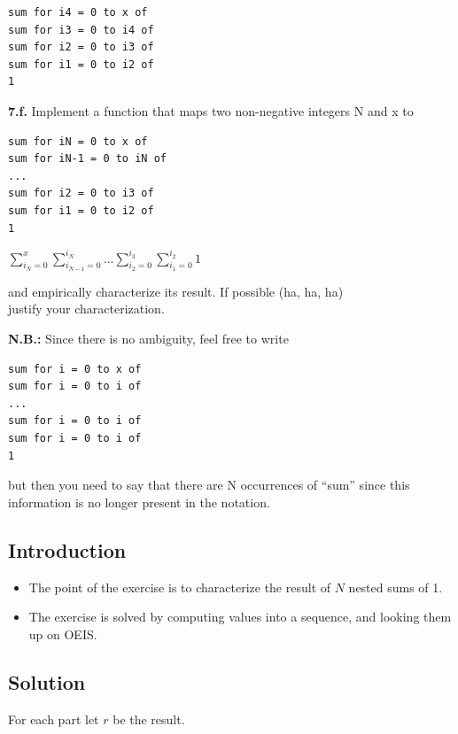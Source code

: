 \documentclass[12pt]{article}
\begin{document}
\begin{verbatim}
sum for i4 = 0 to x of
sum for i3 = 0 to i4 of
sum for i2 = 0 to i3 of
sum for i1 = 0 to i2 of
1
\end{verbatim}

\textbf{7.f.} Implement a function that maps two non-negative integers N and x to

\begin{verbatim}
sum for iN = 0 to x of
sum for iN-1 = 0 to iN of
...
sum for i2 = 0 to i3 of
sum for i1 = 0 to i2 of
1
\end{verbatim}

$\displaystyle\sum_{i_{N}=0}^{x}\sum_{i_{N-1}=0}^{i_{N}}\dots\sum_{i_{2}=0}^{i_{3}}\sum_{i_{1}=0}^{i_{2}}1$

and empirically characterize its result. If possible (ha, ha, ha) \\ justify your
characterization.

\textbf{N.B.:} Since there is no ambiguity, feel free to write

\begin{verbatim}
sum for i = 0 to x of
sum for i = 0 to i of
...
sum for i = 0 to i of
sum for i = 0 to i of
1
\end{verbatim}

but then you need to say that there are N occurrences of ``sum'' since this
information is no longer present in the notation.


\subsection{Introduction}

\begin{itemize}

\item
  The point of the exercise is to characterize the result of $N$ nested sums of 1.

\item
  The exercise is solved by computing values into a sequence, and looking them up on OEIS.

\end{itemize}


\subsection{Solution}

For each part let $r$ be the result.
\end{document}
